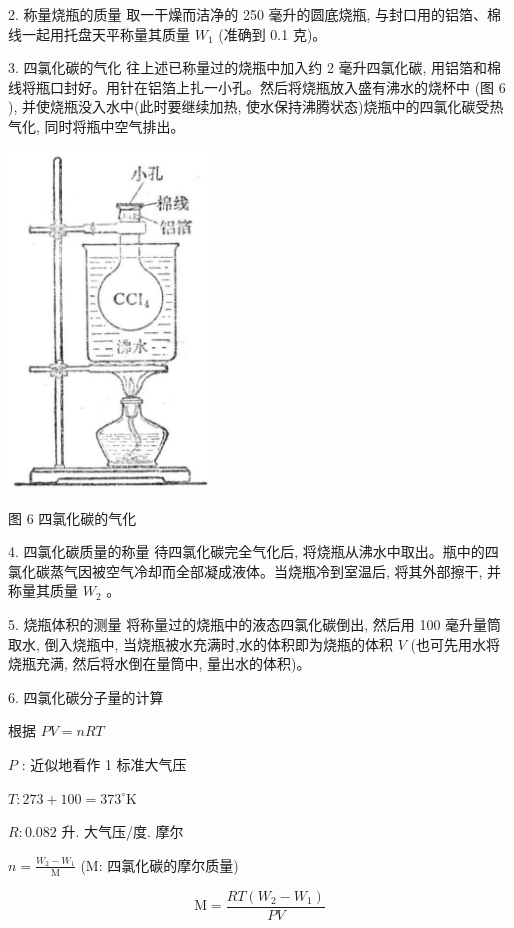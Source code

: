 \documentclass[10pt]{article}
\begin{document}
2. 称量烧瓶的质量 取一干燥而洁净的 250 毫升的圆底烧瓶, 与封口用的铝箔、棉线一起用托盘天平称量其质量 \({W}_{1}\) (准确到 0.1 克)。

3. 四氯化碳的气化 往上述已称量过的烧瓶中加入约 2 毫升四氯化碳, 用铝箔和棉线将瓶口封好。用针在铝箔上扎一小孔。然后将烧瓶放入盛有沸水的烧杯中 (图 6 ), 并使烧瓶没入水中(此时要继续加热, 使水保持沸腾状态)烧瓶中的四氯化碳受热气化, 同时将瓶中空气排出。

\begin{center}
\includegraphics[max width=0.4\textwidth]{images/01912d13-9986-7822-a012-3f3f7be99dcb_231_906705.jpg}
\end{center}

图 6 四氯化碳的气化

4. 四氯化碳质量的称量 待四氯化碳完全气化后, 将烧瓶从沸水中取出。瓶中的四氯化碳蒸气因被空气冷却而全部凝成液体。当烧瓶冷到室温后, 将其外部擦干, 并称量其质量 \({W}_{2}\) 。

5. 烧瓶体积的测量 将称量过的烧瓶中的液态四氯化碳倒出, 然后用 100 毫升量筒取水, 倒入烧瓶中, 当烧瓶被水充满时,水的体积即为烧瓶的体积 \(V\) (也可先用水将烧瓶充满, 然后将水倒在量筒中, 量出水的体积)。

6. 四氯化碳分子量的计算

根据 \({PV} = {nRT}\)

\(P\) : 近似地看作 1 标准大气压

\(T : {273} + {100} = {373}^{ \circ }\mathrm{K}\)

\(R : {0.082}\) 升. 大气压/度. 摩尔

\(n = \frac{{W}_{2} - {W}_{1}}{\mathrm{M}}\) (M: 四氯化碳的摩尔质量)

\[
\mathrm{M} = \frac{{RT}\left( {{W}_{2} - {W}_{1}}\right) }{PV}
\]
\end{document}
